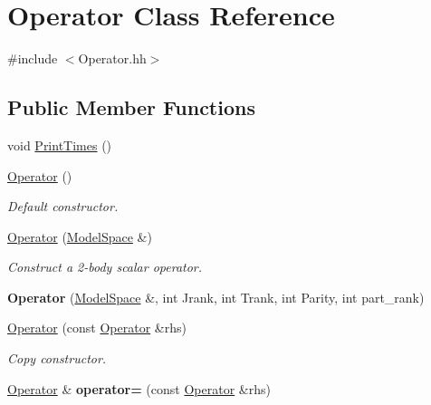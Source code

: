 \hypertarget{classOperator}{\section{Operator Class Reference}
\label{classOperator}
}


{\ttfamily \#include $<$Operator.\-hh$>$}

\subsection*{Public Member Functions}
\begin{DoxyCompactItemize}
\item 
void \hyperlink{classOperator_aa8280e8e2c6be73a9594789127b939c1}{Print\-Times} ()
\item 
\hypertarget{classOperator_acf2514c5e9f48b0a988c955a7d41c486}{\hyperlink{classOperator_acf2514c5e9f48b0a988c955a7d41c486}{Operator} ()}\label{classOperator_acf2514c5e9f48b0a988c955a7d41c486}

\begin{DoxyCompactList}\small\item\em Default constructor. \end{DoxyCompactList}\item 
\hypertarget{classOperator_ae59dd1e9ea828f88637f001e987195b6}{\hyperlink{classOperator_ae59dd1e9ea828f88637f001e987195b6}{Operator} (\hyperlink{classModelSpace}{Model\-Space} \&)}\label{classOperator_ae59dd1e9ea828f88637f001e987195b6}

\begin{DoxyCompactList}\small\item\em Construct a 2-\/body scalar operator. \end{DoxyCompactList}\item 
\hypertarget{classOperator_ab120301ff79330ae6593fd13445f24f1}{{\bfseries Operator} (\hyperlink{classModelSpace}{Model\-Space} \&, int Jrank, int Trank, int Parity, int part\-\_\-rank)}\label{classOperator_ab120301ff79330ae6593fd13445f24f1}

\item 
\hypertarget{classOperator_ae229a22ab49ca258f69c1c2c267b2aeb}{\hyperlink{classOperator_ae229a22ab49ca258f69c1c2c267b2aeb}{Operator} (const \hyperlink{classOperator}{Operator} \&rhs)}\label{classOperator_ae229a22ab49ca258f69c1c2c267b2aeb}

\begin{DoxyCompactList}\small\item\em Copy constructor. \end{DoxyCompactList}\item 
\hypertarget{classOperator_afad114ba9dee8b9c08af0b5d27c3ba86}{\hyperlink{classOperator}{Operator} \& {\bfseries operator=} (const \hyperlink{classOperator}{Operator} \&rhs)}\label{classOperator_afad114ba9dee8b9c08af0b5d27c3ba86}


\end{DoxyCompactItemize}
